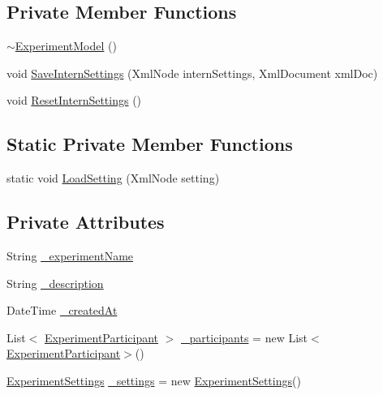 \subsection*{Private Member Functions}
\begin{DoxyCompactItemize}
\item 
\hyperlink{class_web_analyzer_1_1_models_1_1_base_1_1_experiment_model_a08740ebbb438a9d8300bc537017c72c2}{$\sim$\+Experiment\+Model} ()
\item 
void \hyperlink{class_web_analyzer_1_1_models_1_1_base_1_1_experiment_model_a7a634ff267195bc2b3af083d6d20d81c}{Save\+Intern\+Settings} (Xml\+Node intern\+Settings, Xml\+Document xml\+Doc)
\item 
void \hyperlink{class_web_analyzer_1_1_models_1_1_base_1_1_experiment_model_acf8637b65ca6f75a4fc412f7290e0091}{Reset\+Intern\+Settings} ()
\end{DoxyCompactItemize}
\subsection*{Static Private Member Functions}
\begin{DoxyCompactItemize}
\item 
static void \hyperlink{class_web_analyzer_1_1_models_1_1_base_1_1_experiment_model_a63429921e06c48ec66370f615d235bea}{Load\+Setting} (Xml\+Node setting)
\end{DoxyCompactItemize}
\subsection*{Private Attributes}
\begin{DoxyCompactItemize}
\item 
String \hyperlink{class_web_analyzer_1_1_models_1_1_base_1_1_experiment_model_a2e9168576a6110f27ea44886e19ff5da}{\+\_\+experiment\+Name}
\item 
String \hyperlink{class_web_analyzer_1_1_models_1_1_base_1_1_experiment_model_a55777bd2fa8b71c034d49baad38c6ea3}{\+\_\+description}
\item 
Date\+Time \hyperlink{class_web_analyzer_1_1_models_1_1_base_1_1_experiment_model_a406cd5a0a10b170f9182492f493cc05a}{\+\_\+created\+At}
\item 
List$<$ \hyperlink{class_web_analyzer_1_1_models_1_1_base_1_1_experiment_participant}{Experiment\+Participant} $>$ \hyperlink{class_web_analyzer_1_1_models_1_1_base_1_1_experiment_model_ae9f31e30ec2c655a5c06de17f1e40a7c}{\+\_\+participants} = new List$<$\hyperlink{class_web_analyzer_1_1_models_1_1_base_1_1_experiment_participant}{Experiment\+Participant}$>$()
\item 
\hyperlink{class_web_analyzer_1_1_models_1_1_settings_model_1_1_experiment_settings}{Experiment\+Settings} \hyperlink{class_web_analyzer_1_1_models_1_1_base_1_1_experiment_model_ae907589850044fa39b4f1991c60d95ad}{\+\_\+settings} = new \hyperlink{class_web_analyzer_1_1_models_1_1_settings_model_1_1_experiment_settings}{Experiment\+Settings}()
\end{DoxyCompactItemize}


